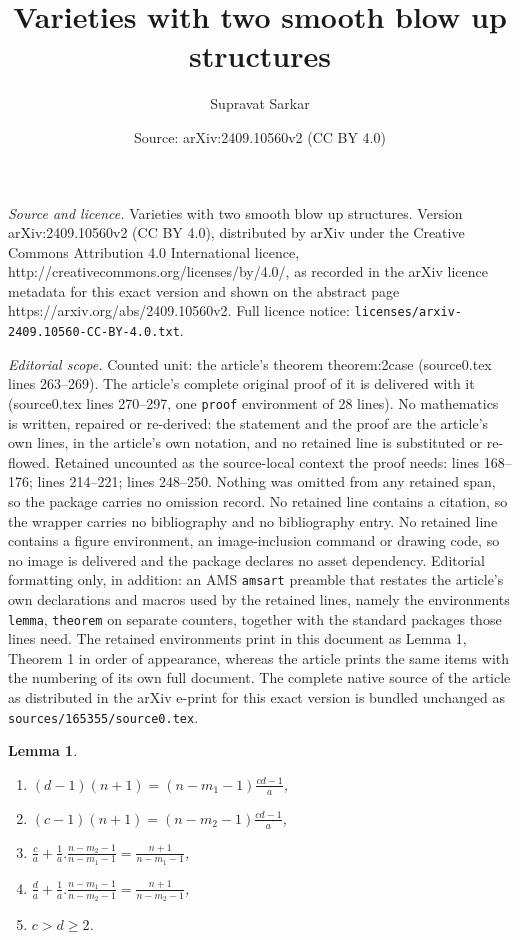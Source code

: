 \documentclass[10pt,a4paper]{amsart}
\title{Varieties with two smooth blow up structures}
\author{Supravat Sarkar}
\date{Source: arXiv:2409.10560v2 (CC BY 4.0)}
\newtheorem{lemma}{Lemma}
\begin{document}
\maketitle

\noindent\emph{Source and licence.} Varieties with two smooth blow up structures. Version arXiv:2409.10560v2 (CC BY 4.0), distributed by arXiv under the Creative Commons Attribution 4.0 International licence, http://creativecommons.org/licenses/by/4.0/, as recorded in the arXiv licence metadata for this exact version and shown on the abstract page https://arxiv.org/abs/2409.10560v2. Full licence notice: \texttt{licenses/arxiv-2409.10560-CC-BY-4.0.txt}.\par\smallskip

\noindent\textit{Editorial scope.} Counted unit: the article's theorem theorem:2case (source0.tex lines 263--269). The article's complete original proof of it is delivered with it (source0.tex lines 270--297, one \texttt{proof} environment of 28 lines). No mathematics is written, repaired or re-derived: the statement and the proof are the article's own lines, in the article's own notation, and no retained line is substituted or re-flowed.  Retained uncounted as the source-local context the proof needs: lines 168--176; lines 214--221; lines 248--250.  Nothing was omitted from any retained span, so the package carries no omission record.  No retained line contains a citation, so the wrapper carries no bibliography and no bibliography entry.  No retained line contains a figure environment, an image-inclusion command or drawing code, so no image is delivered and the package declares no asset dependency.  Editorial formatting only, in addition: an AMS \texttt{amsart} preamble that restates the article's own declarations and macros used by the retained lines, namely the environments \texttt{lemma}, \texttt{theorem} on separate counters, together with the standard packages those lines need.  The retained environments print in this document as Lemma 1, Theorem 1 in order of appearance, whereas the article prints the same items with the numbering of its own full document.  The complete native source of the article as distributed in the arXiv e-print for this exact version is bundled unchanged as \texttt{sources/165355/source0.tex}.
\begin{lemma}\label{lemma:katz}
    \begin{enumerate}
        \item [(i)] $(d-1)(n+1)=(n-m_1-1)\frac{cd-1}{a}$,
        \item [(ii)] $(c-1)(n+1)=(n-m_2-1)\frac{cd-1}{a}$,
        \item [(iii)] $\frac{c}{a}+\frac{1}{a}. \frac{n-m_2-1}{n-m_1-1}=\frac{n+1}{n-m_1-1}$,
        \item [(iv)]$\frac{d}{a}+\frac{1}{a} .\frac{n-m_1-1}{n-m_2-1}=\frac{n+1}{n-m_2-1}$,
        \item [(v)]$c>d\geq 2$.
    \end{enumerate}
\end{lemma}
\end{document}
